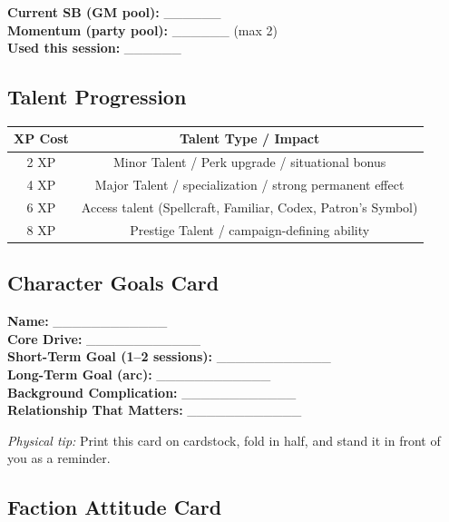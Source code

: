 \begin{tcolorbox}[colback=white,colframe=black,left=1em,right=1em,top=0.5em,bottom=0.5em,breakable]
\textbf{Current SB (GM pool):} \_\_\_\_\_\_ \\
\textbf{Momentum (party pool):} \_\_\_\_\_\_  (max 2) \\
\textbf{Used this session:} \_\_\_\_\_\_
\end{tcolorbox}

\subsection{Talent Progression}

\centering
\begin{tabular}{|c|c|}
\hline
\textbf{XP Cost} & \textbf{Talent Type / Impact} \\
\hline
2 XP & Minor Talent / Perk upgrade / situational bonus \\
4 XP & Major Talent / specialization / strong permanent effect \\
6 XP & Access talent (Spellcraft, Familiar, Codex, Patron's Symbol) \\
8 XP & Prestige Talent / campaign-defining ability \\
\hline
\end{tabular}
\par

\subsection{Character Goals Card}

\begin{tcolorbox}[colback=white,colframe=black,width=\textwidth,left=1em,right=1em,breakable]
\textbf{Name:} \_\_\_\_\_\_\_\_\_\_\_\_ \\
\textbf{Core Drive:} \_\_\_\_\_\_\_\_\_\_\_\_ \\
\textbf{Short-Term Goal (1--2 sessions):} \_\_\_\_\_\_\_\_\_\_\_\_ \\
\textbf{Long-Term Goal (arc):} \_\_\_\_\_\_\_\_\_\_\_\_ \\
\textbf{Background Complication:} \_\_\_\_\_\_\_\_\_\_\_\_ \\
\textbf{Relationship That Matters:} \_\_\_\_\_\_\_\_\_\_\_\_
\end{tcolorbox}

\emph{Physical tip:} Print this card on cardstock, fold in half, and stand it in front of you as a reminder.

\subsection{Faction Attitude Card}

